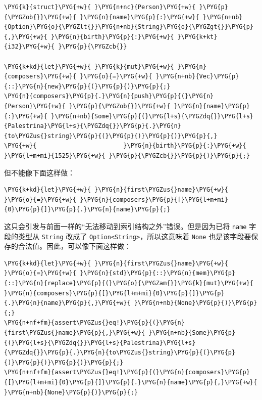 \begin{Verbatim}[commandchars=\\\{\},breaklines=true,breakanywhere=true,fontsize=\codefont,xleftmargin=17bp]
\PYG{k}{struct}\PYG{+w}{ }\PYG{n+nc}{Person}\PYG{+w}{ }\PYG{p}{\PYGZob{}}\PYG{+w}{ }\PYG{n}{name}\PYG{p}{:}\PYG{+w}{ }\PYG{n+nb}{Option}\PYG{o}{\PYGZlt{}}\PYG{n+nb}{String}\PYG{o}{\PYGZgt{}}\PYG{p}{,}\PYG{+w}{ }\PYG{n}{birth}\PYG{p}{:}\PYG{+w}{ }\PYG{k+kt}{i32}\PYG{+w}{ }\PYG{p}{\PYGZcb{}}

\PYG{k+kd}{let}\PYG{+w}{ }\PYG{k}{mut}\PYG{+w}{ }\PYG{n}{composers}\PYG{+w}{ }\PYG{o}{=}\PYG{+w}{ }\PYG{n+nb}{Vec}\PYG{p}{::}\PYG{n}{new}\PYG{p}{(}\PYG{p}{)}\PYG{p}{;}
\PYG{n}{composers}\PYG{p}{.}\PYG{n}{push}\PYG{p}{(}\PYG{n}{Person}\PYG{+w}{ }\PYG{p}{\PYGZob{}}\PYG{+w}{ }\PYG{n}{name}\PYG{p}{:}\PYG{+w}{ }\PYG{n+nb}{Some}\PYG{p}{(}\PYG{l+s}{\PYGZdq{}}\PYG{l+s}{Palestrina}\PYG{l+s}{\PYGZdq{}}\PYG{p}{.}\PYG{n}{to\PYGZus{}string}\PYG{p}{(}\PYG{p}{)}\PYG{p}{)}\PYG{p}{,}
\PYG{+w}{                        }\PYG{n}{birth}\PYG{p}{:}\PYG{+w}{ }\PYG{l+m+mi}{1525}\PYG{+w}{ }\PYG{p}{\PYGZcb{}}\PYG{p}{)}\PYG{p}{;}
\end{Verbatim}

但不能像下面这样做：

\begin{Verbatim}[commandchars=\\\{\},breaklines=true,breakanywhere=true,fontsize=\codefont,xleftmargin=17bp]
\PYG{k+kd}{let}\PYG{+w}{ }\PYG{n}{first\PYGZus{}name}\PYG{+w}{ }\PYG{o}{=}\PYG{+w}{ }\PYG{n}{composers}\PYG{p}{[}\PYG{l+m+mi}{0}\PYG{p}{]}\PYG{p}{.}\PYG{n}{name}\PYG{p}{;}
\end{Verbatim}

这只会引发与前面一样的“无法移动到索引结构之外”错误。但是因为已将 \texttt{name} 字段的类型从 \texttt{String} 改成了 \texttt{Option<String>}，所以这意味着 \texttt{None} 也是该字段要保存的合法值。因此，可以像下面这样做：

\begin{Verbatim}[commandchars=\\\{\},breaklines=true,breakanywhere=true,fontsize=\codefont,xleftmargin=17bp]
\PYG{k+kd}{let}\PYG{+w}{ }\PYG{n}{first\PYGZus{}name}\PYG{+w}{ }\PYG{o}{=}\PYG{+w}{ }\PYG{n}{std}\PYG{p}{::}\PYG{n}{mem}\PYG{p}{::}\PYG{n}{replace}\PYG{p}{(}\PYG{o}{\PYGZam{}}\PYG{k}{mut}\PYG{+w}{ }\PYG{n}{composers}\PYG{p}{[}\PYG{l+m+mi}{0}\PYG{p}{]}\PYG{p}{.}\PYG{n}{name}\PYG{p}{,}\PYG{+w}{ }\PYG{n+nb}{None}\PYG{p}{)}\PYG{p}{;}
\PYG{n+nf+fm}{assert\PYGZus{}eq!}\PYG{p}{(}\PYG{n}{first\PYGZus{}name}\PYG{p}{,}\PYG{+w}{ }\PYG{n+nb}{Some}\PYG{p}{(}\PYG{l+s}{\PYGZdq{}}\PYG{l+s}{Palestrina}\PYG{l+s}{\PYGZdq{}}\PYG{p}{.}\PYG{n}{to\PYGZus{}string}\PYG{p}{(}\PYG{p}{)}\PYG{p}{)}\PYG{p}{)}\PYG{p}{;}
\PYG{n+nf+fm}{assert\PYGZus{}eq!}\PYG{p}{(}\PYG{n}{composers}\PYG{p}{[}\PYG{l+m+mi}{0}\PYG{p}{]}\PYG{p}{.}\PYG{n}{name}\PYG{p}{,}\PYG{+w}{ }\PYG{n+nb}{None}\PYG{p}{)}\PYG{p}{;}
\end{Verbatim}

